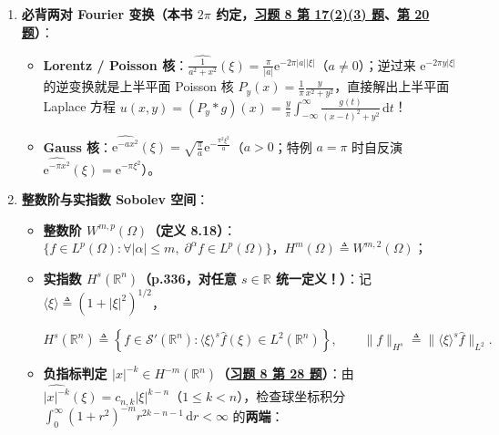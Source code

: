\documentclass[11pt,a4paper]{article}
\providecommand{\tightlist}{\setlength{\itemsep}{2pt}\setlength{\parskip}{0pt}}
\newcommand{\FitDisplayMath}[1]{%
  \par\vspace{4.5pt}\noindent
  \begin{adjustbox}{max width=\linewidth, center}
    $\displaystyle #1$
  \end{adjustbox}
  \par\vspace{4.5pt}%
}
\begin{document}
\begin{enumerate}
\def\labelenumi{\arabic{enumi}.}
\tightlist
\item
  \textbf{必背两对 Fourier 变换（本书 \(2\pi\) 约定，\hyperlink{prob:8-17}{\textcolor{LinkColor}{习题 8 第 17(2)(3) 题}}、\hyperlink{prob:8-20}{\textcolor{LinkColor}{第 20 题}}）}：

  \begin{itemize}
  \tightlist
  \item
    \textbf{Lorentz / Poisson 核}：\(\widehat{\frac{1}{a^2 + x^2}}(\xi) = \frac{\pi}{\lvert a\rvert}\mathrm{e}^{-2\pi\lvert a\rvert\lvert\xi\rvert}\)（\(a \neq 0\)）；逆过来 \(\mathrm{e}^{-2\pi y\lvert\xi\rvert}\) 的逆变换就是上半平面 Poisson 核 \(P_y(x) = \frac{1}{\pi}\frac{y}{x^2+y^2}\)，直接解出上半平面 Laplace 方程 \(u(x,y) = (P_y * g)(x) = \frac{y}{\pi}\int_{-\infty}^\infty \frac{g(t)}{(x-t)^2+y^2}\,\mathrm{d}t\)！
  \item
    \textbf{Gauss 核}：\(\widehat{\mathrm{e}^{-ax^2}}(\xi) = \sqrt{\frac{\pi}{a}}\mathrm{e}^{-\frac{\pi^2\xi^2}{a}}\)（\(a > 0\)；特例 \(a=\pi\) 时自反演 \(\widehat{\mathrm{e}^{-\pi x^2}}(\xi)=\mathrm{e}^{-\pi\xi^2}\)）。
  \end{itemize}
\item
  \textbf{整数阶与实指数 Sobolev 空间}：

  \begin{itemize}
  \tightlist
  \item
    \textbf{整数阶 \(W^{m,p}(\Omega)\)（定义 8.18）}：\(\{f \in L^p(\Omega) : \forall\lvert\alpha\rvert\le m,\; \partial^\alpha f \in L^p(\Omega)\}\)，\(H^m(\Omega) \triangleq W^{m,2}(\Omega)\)；
  \item
    \textbf{实指数 \(H^s(\mathbb{R}^n)\)（p.336，对任意 \(s \in \mathbb{R}\) 统一定义！）}：记 \(\langle\xi\rangle \triangleq (1 + \lvert\xi\rvert^2)^{1/2}\)， 
\FitDisplayMath{H^s(\mathbb{R}^n) \triangleq \left\{f \in \mathcal{S}'(\mathbb{R}^n) : \langle\xi\rangle^s \hat{f}(\xi) \in L^2(\mathbb{R}^n)\right\}, \qquad \lVert f\rVert_{H^s} \triangleq \lVert\langle\xi\rangle^s \hat{f}\rVert_{L^2}.}

  \item
    \textbf{负指标判定 \(\lvert x\rvert^{-k} \in H^{-m}(\mathbb{R}^n)\)（\hyperlink{prob:8-28}{\textcolor{LinkColor}{习题 8 第 28 题}}）}：由 \(\widehat{\lvert x\rvert^{-k}}(\xi) = c_{n,k}\lvert\xi\rvert^{k-n}\)（\(1\le k<n\)），检查球坐标积分 \(\int_0^\infty (1+r^2)^{-m} r^{2k-n-1}\,\mathrm{d}r < \infty\) 的\textbf{两端}：


\end{itemize}
\end{enumerate}
\end{document}
